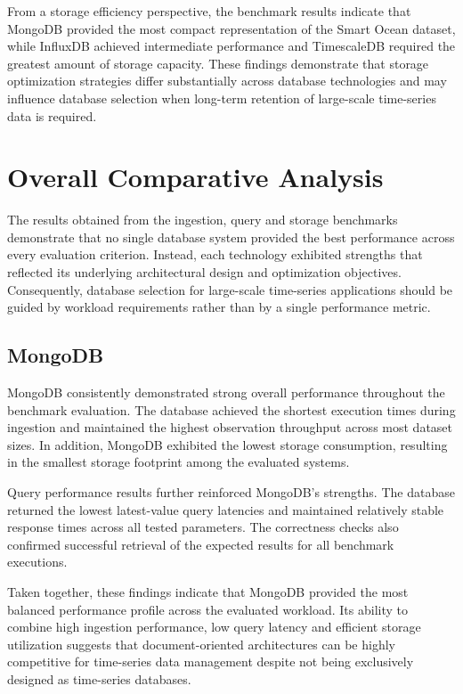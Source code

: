 From a storage efficiency perspective, the benchmark results indicate that MongoDB provided the most compact representation of the Smart Ocean dataset, while InfluxDB achieved intermediate performance and TimescaleDB required the greatest amount of storage capacity. These findings demonstrate that storage optimization strategies differ substantially across database technologies and may influence database selection when long-term retention of large-scale time-series data is required.



\section{Overall Comparative Analysis}
The results obtained from the ingestion, query and storage benchmarks demonstrate that no single database system provided the best performance across every evaluation criterion. Instead, each technology exhibited strengths that reflected its underlying architectural design and optimization objectives. Consequently, database selection for large-scale time-series applications should be guided by workload requirements rather than by a single performance metric.


\subsection{MongoDB}
MongoDB consistently demonstrated strong overall performance throughout the benchmark evaluation. The database achieved the shortest execution times during ingestion and maintained the highest observation throughput across most dataset sizes. In addition, MongoDB exhibited the lowest storage consumption, resulting in the smallest storage footprint among the evaluated systems.

Query performance results further reinforced MongoDB's strengths. The database returned the lowest latest-value query latencies and maintained relatively stable response times across all tested parameters. The correctness checks also confirmed successful retrieval of the expected results for all benchmark executions.

Taken together, these findings indicate that MongoDB provided the most balanced performance profile across the evaluated workload. Its ability to combine high ingestion performance, low query latency and efficient storage utilization suggests that document-oriented architectures can be highly competitive for time-series data management despite not being exclusively designed as time-series databases.

